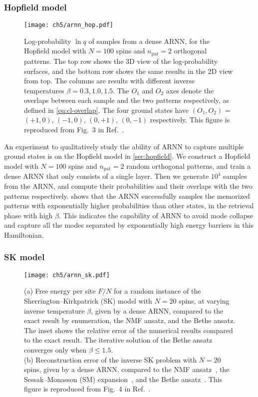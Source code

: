 \subsubsection{Hopfield model}

\begin{figure}[htb]
\centering
\texttt{[image: ch5/arnn\_hop.pdf]}
\caption[ARNN results of Hopfield model]{
Log-probability $\ln q$ of samples from a dense ARNN, for the Hopfield model with $N = 100$ spins and $n_\text{pat} = 2$ orthogonal patterns.
The top row shows the 3D view of the log-probability surfaces, and the bottom row shows the same results in the 2D view from top.
The columns are results with different inverse temperatures $\beta = 0.3, 1.0, 1.5$.
The $O_1$ and $O_2$ axes denote the overlaps between each sample and the two patterns respectively, as defined in \cref{eq:cl-overlap}.
The four ground states have $(O_1, O_2)$ = $(+1, 0)$, $(-1, 0)$, $(0, +1)$, $(0, -1)$ respectively.
This figure is reproduced from Fig.~3 in Ref.~\cite{wu2019solving}.
}
\label{fig:arnn-hop}
\end{figure}

An experiment to qualitatively study the ability of ARNN to capture multiple ground states is on the Hopfield model in \cref{sec:hopfield}. We construct a Hopfield model with $N = 100$ spins and $n_\text{pat} = 2$ random orthogonal patterns, and train a dense ARNN that only consists of a single layer. Then we generate $10^4$ samples from the ARNN, and compute their probabilities and their overlaps with the two patterns respectively.  shows that the ARNN successfully samples the memorized patterns with exponentially higher probabilities than other states, in the retrieval phase with high $\beta$. This indicates the capability of ARNN to avoid mode collapse and capture all the modes separated by exponentially high energy barriers in this Hamiltonian.

\subsubsection{SK model}

\begin{figure}[htb]
\centering
\texttt{[image: ch5/arnn\_sk.pdf]}
\caption[ARNN results of Sherrington--Kirkpatrick (SK) model and inverse SK problem]{
(a) Free energy per site $F / N$ for a random instance of the Sherrington--Kirkpatrick (SK) model with $N = 20$ spins, at varying inverse temperature $\beta$, given by a dense ARNN, compared to the exact result by enumeration, the NMF ansatz, and the Bethe ansatz. The inset shows the relative error of the numerical results compared to the exact result.
The iterative solution of the Bethe ansatz converges only when $\beta \le 1.5$. \\
(b) Reconstruction error of the inverse SK problem with $N = 20$ spins, given by a dense ARNN, compared to the NMF ansatz~\cite{roudi2009ising}, the Sessak--Monasson (SM) expansion~\cite{sessak2009small}, and the Bethe ansatz~\cite{ricci2012bethe}.
This figure is reproduced from Fig.~4 in Ref.~\cite{wu2019solving}.
}
\label{fig:arnn-sk}
\end{figure}

